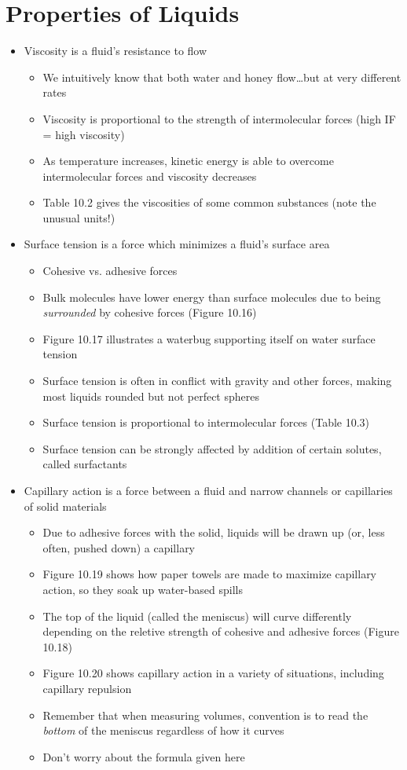 \documentclass[12pt, openany, letterpaper]{memoir}
\begin{document}
\section{Properties of Liquids}
\begin{itemize}
  \item Viscosity is a fluid's resistance to flow
  \begin{itemize}
    \item We intuitively know that both water and honey flow\ldots but at very different rates
    \item Viscosity is proportional to the strength of intermolecular forces (high IF = high viscosity)
    \item As temperature increases, kinetic energy is able to overcome intermolecular forces and viscosity decreases
    \item Table 10.2 gives the viscosities of some common substances (note the unusual units!)
  \end{itemize}
  \item Surface tension is a force which minimizes a fluid's surface area
  \begin{itemize}
    \item Cohesive vs. adhesive forces
    \item Bulk molecules have lower energy than surface molecules due to being \emph{surrounded} by cohesive forces (Figure 10.16)
    \item Figure 10.17 illustrates a waterbug supporting itself on water surface tension
    \item Surface tension is often in conflict with gravity and other forces, making most liquids rounded but not perfect spheres
    \item Surface tension is proportional to intermolecular forces (Table 10.3)
    \item Surface tension can be strongly affected by addition of certain solutes, called surfactants
  \end{itemize}
  \item Capillary action is a force between a fluid and narrow channels or capillaries of solid materials
  \begin{itemize}
    \item Due to adhesive forces with the solid, liquids will be drawn up (or, less often, pushed down) a capillary
    \item Figure 10.19 shows how paper towels are made to maximize capillary action, so they soak up water-based spills
    \item The top of the liquid (called the meniscus) will curve differently depending on the reletive strength of cohesive and adhesive forces (Figure 10.18)
    \item Figure 10.20 shows capillary action in a variety of situations, including capillary repulsion
    \item Remember that when measuring volumes, convention is to read the \emph{bottom} of the meniscus regardless of how it curves
    \item Don't worry about the formula given here
  \end{itemize}
\end{itemize}
\end{document}
